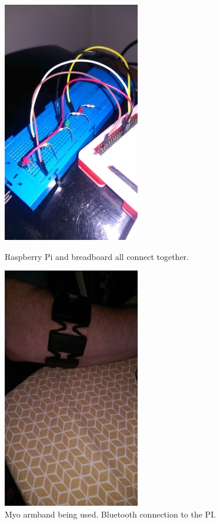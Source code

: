 \documentclass[12pt,a4paper,oneside,openany]{book}
\begin{document}
\begin{figure}[!b]
	\begin{minipage}[b]{0.47\textwidth}
		\includegraphics{raspberry.jpg}
		\caption{Raspberry Pi and breadboard all connect together.}
	\end{minipage}
	\hfill
	\begin{minipage}[b]{0.47\textwidth}
		\includegraphics{myo.jpg}
		\caption{Myo armband being used. Bluetooth connection to the PI.}
	\end{minipage}
\end{figure}
\end{document}
